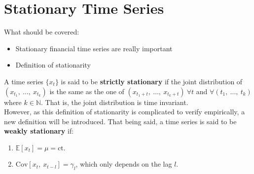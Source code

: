 \documentclass[a4paper]{article}
\begin{document}
\newpage\null\thispagestyle{empty}\newpage

\section{Stationary Time Series}
\label{sec:stationaryTimeSeries}
What should be covered:
\begin{itemize}
	\item Stationary financial time series are really important

	\item Definition of stationarity
\end{itemize}

\vspace{2cm}









A time series $\{x_t\}$ is said to be \textbf{strictly stationary} 
if the joint distribution of $(x_{t_1},\ \ldots ,\ x_{t_k})$ is the same as 
the one of $(x_{t_1 + t},\ \ldots ,\ x_{t_k + t})\ \forall t$ and 
$\forall (t_1,\ \ldots,\ t_k)$ where $k \in \mathbb{N}$. That is, the joint 
distribution is time invariant.\\

However, as this definition of stationarity is complicated to verify 
empirically, a new definition will be introduced. That being said, a time 
series is said to be \textbf{weakly stationary} if:

\begin{enumerate}
	\item $\mathbb{E}[x_t] = \mu = \text{ct.}$
	\item $\text{Cov}[x_t,\ x_{t-l}] = \gamma_{l}$, which 
	only depends on the lag $l$.
\end{enumerate}
\end{document}
